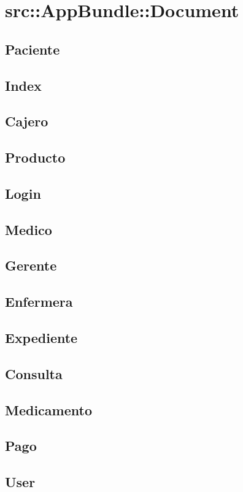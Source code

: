 	\section{src::AppBundle::Document}
	
	\subsection{Paciente}
		\subsection{Index}
		\subsection{Cajero}
		\subsection{Producto}
		\subsection{Login}
		\subsection{Medico}
		\subsection{Gerente}
		\subsection{Enfermera}
		\subsection{Expediente}
		\subsection{Consulta}
		\subsection{Medicamento}
		\subsection{Pago}
		\subsection{User}
		
